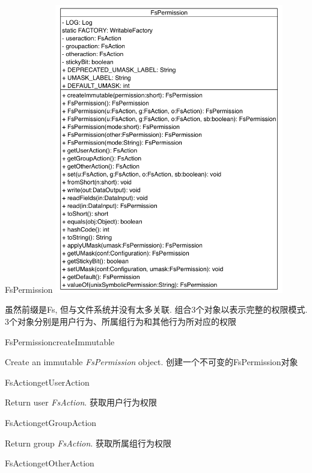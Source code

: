 \begin{XeClass}{FsPermission}
\includegraphics[width=10cm]{cdig/FsPermission.png}
     
 虽然前缀是Fs, 但与文件系统并没有太多关联.
 组合3个对象以表示完整的权限模式.
 3个对象分别是用户行为、所属组行为和其他行为所对应的权限

    \begin{XeMethod}{\XePublic}{FsPermission}{createImmutable}
         
 Create an immutable \emph{FsPermission} object.
 创建一个不可变的FsPermission对象

    \end{XeMethod}

    \begin{XeMethod}{\XePublic}{FsAction}{getUserAction}
         
 Return user \emph{FsAction}.
 获取用户行为权限

    \end{XeMethod}

    \begin{XeMethod}{\XePublic}{FsAction}{getGroupAction}
         
 Return group \emph{FsAction}.
 获取所属组行为权限

    \end{XeMethod}

    \begin{XeMethod}{\XePublic}{FsAction}{getOtherAction}
         

\end{XeMethod}
\end{XeClass}
